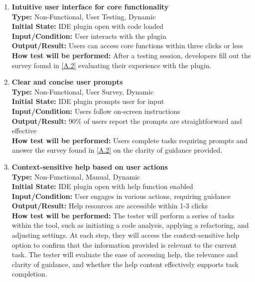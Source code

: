 \documentclass[12pt, titlepage]{article}
\begin{document}
\begin{enumerate}[label={\bf \textcolor{Maroon}{test-UH-\arabic*}},
    wide=0pt, font=\itshape]
    \item \textbf{Intuitive user interface for core functionality} \\[2mm]
      \textbf{Type:} Non-Functional, User Testing, Dynamic \\
      \textbf{Initial State:} IDE plugin open with code loaded \\
      \textbf{Input/Condition:} User interacts with the plugin \\
      \textbf{Output/Result:} Users can access core functions within
      three clicks or less \\[2mm]
      \textbf{How test will be performed:} After a testing session,
      developers fill out the survey found in \ref{A.2} evaluating
      their experience with the plugin.

    \item \textbf{Clear and concise user prompts} \\[2mm]
      \textbf{Type:} Non-Functional, User Survey, Dynamic \\
      \textbf{Initial State:} IDE plugin prompts user for input \\
      \textbf{Input/Condition:} Users follow on-screen instructions \\
      \textbf{Output/Result:} 90\% of users report the prompts are
      straightforward and effective \\[2mm]
      \textbf{How test will be performed:} Users complete tasks
      requiring prompts and answer the survey found in \ref{A.2} on
      the clarity of guidance provided.

    \item \textbf{Context-sensitive help based on user actions} \\[2mm]
      \textbf{Type:} Non-Functional, Manual, Dynamic \\
      \textbf{Initial State:} IDE plugin open with help function enabled \\
      \textbf{Input/Condition:} User engages in various actions,
      requiring guidance \\
      \textbf{Output/Result:} Help resources are accessible within
      1-3 clicks \\[2mm]
      \textbf{How test will be performed:} The tester will perform a
      series of tasks within the tool, such as initiating a code
      analysis, applying a refactoring, and adjusting settings. At
      each step, they will access the context-sensitive help option
      to confirm that the information provided is relevant to the
      current task. The tester will evaluate the ease of accessing
      help, the relevance and clarity of guidance, and whether the
      help content effectively supports task completion.


\end{enumerate}
\end{document}
